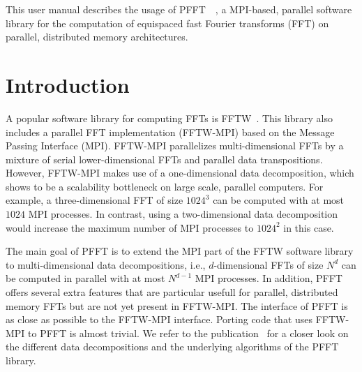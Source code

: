 This user manual describes the usage of PFFT~\pfftversion~\cite{pfft,Pi13}, a MPI-based, parallel software library for the
computation of equispaced fast Fourier transforms (FFT) on parallel, distributed memory architectures.

\chapter{Introduction}\label{chap:intro}
A popular software library for computing FFTs is FFTW~\cite{fftw, FFTW05}. This library also includes a parallel FFT implementation (FFTW-MPI) based on the Message Passing Interface (MPI).
FFTW-MPI parallelizes multi-dimensional FFTs by a mixture of serial lower-dimensional FFTs and parallel data transpositions.
However, FFTW-MPI makes use of a one-dimensional data decomposition, which shows to be a scalability bottleneck on large scale, parallel computers.
For example, a three-dimensional FFT of size $1024^3$ can be computed with at most $1024$ MPI processes.
In contrast, using a two-dimensional data decomposition would increase the maximum number of MPI processes to $1024^2$ in this case.

The main goal of PFFT is to extend the MPI part of the FFTW software library to multi-dimensional data decompositions,
i.e., $d$-dimensional FFTs of size $N^d$ can be computed in parallel with at most $N^{d-1}$ MPI processes.
In addition, PFFT offers several extra features that are particular usefull for parallel, distributed memory FFTs but are not yet present in FFTW-MPI.
The interface of PFFT is as close as possible to the FFTW-MPI interface. Porting code that uses FFTW-MPI to PFFT is almost trivial.
We refer to the publication~\cite{Pi13} for a closer look on the different data decompositions and the underlying algorithms of the PFFT library.

